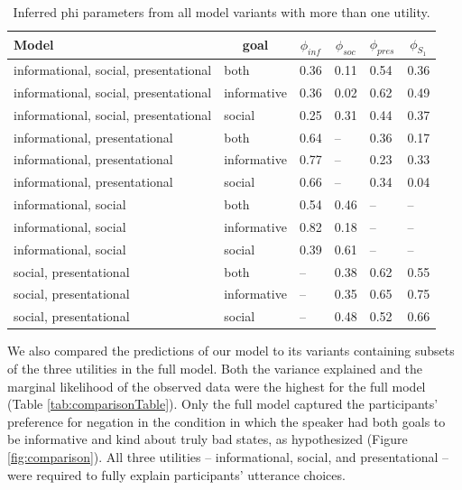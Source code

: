 \documentclass[floatsintext,mask,man]{apa6}
\theoremstyle{definition}
\theoremstyle{definition}
\theoremstyle{definition}
\theoremstyle{remark}
\begin{document}
\begin{table}[tbp]
\begin{center}
\begin{threeparttable}
\caption{\label{tab:phi}Inferred phi parameters from all model variants with more than one utility.}
\begin{tabular}{llllll}
\toprule
Model & \multicolumn{1}{c}{goal} & \multicolumn{1}{c}{$\phi_{inf}$} & \multicolumn{1}{c}{$\phi_{soc}$} & \multicolumn{1}{c}{$\phi_{pres}$} & \multicolumn{1}{c}{$\phi_{S_1}$}\\
\midrule
informational, social, presentational & both & 0.36 & 0.11 & 0.54 & 0.36\\
informational, social, presentational & informative & 0.36 & 0.02 & 0.62 & 0.49\\
informational, social, presentational & social & 0.25 & 0.31 & 0.44 & 0.37\\
informational, presentational & both & 0.64 & -- & 0.36 & 0.17\\
informational, presentational & informative & 0.77 & -- & 0.23 & 0.33\\
informational, presentational & social & 0.66 & -- & 0.34 & 0.04\\
informational, social & both & 0.54 & 0.46 & -- & --\\
informational, social & informative & 0.82 & 0.18 & -- & --\\
informational, social & social & 0.39 & 0.61 & -- & --\\
social, presentational & both & -- & 0.38 & 0.62 & 0.55\\
social, presentational & informative & -- & 0.35 & 0.65 & 0.75\\
social, presentational & social & -- & 0.48 & 0.52 & 0.66\\
\bottomrule
\end{tabular}
\end{threeparttable}
\end{center}
\end{table}

We also compared the predictions of our model to its variants containing
subsets of the three utilities in the full model. Both the variance
explained and the marginal likelihood of the observed data were the
highest for the full model (Table \ref{tab:comparisonTable}). Only the
full model captured the participants' preference for negation in the
condition in which the speaker had both goals to be informative and kind
about truly bad states, as hypothesized (Figure \ref{fig:comparison}).
All three utilities -- informational, social, and presentational -- were
required to fully explain participants' utterance choices.
\end{document}
